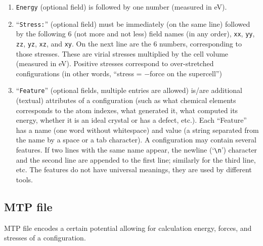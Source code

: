 \documentclass[12pt]{article}
\renewcommand{\_}{\char`_}
\begin{document}
\begin{enumerate}
	\item \texttt{Energy} (optional field) is followed by one number (measured in eV). 
	
	\item ``\texttt{Stress:}'' (optional field) must be immediately (on the same line) followed by the following 6 (not more and not less) field names (in any order), \texttt{xx}, \texttt{yy}, \texttt{zz}, \texttt{yz}, \texttt{xz}, and \texttt{xy}.
	On the next line are the 6 numbers, corresponding to those stresses.
	These are virial stresses multiplied by the cell volume (measured in eV).
	Positive stresses correspond to over-stretched configurations (in other words, ``stress = $-$force on the supercell'')
	
	\item ``\texttt{Feature}'' (optional fields, multiple entries are allowed) is/are additional (textual) attributes of a configuration (such as what chemical elements corresponds to the atom indexes, what generated it, what computed its energy, whether it is an ideal crystal or has a defect, etc.). Each ``Feature'' has a name (one word without whitespace) and value (a string separated from the name by a space or a tab character). A configuration may contain several features. 
	If two lines with the same name appear, the newline (`\texttt{\textbackslash n}') character and the second line are appended to the first line; similarly for the third line, etc.
	The features do not have universal meanings, they are used by different tools.
\end{enumerate}




\subsection{MTP file}\label{sup:mlip:mtp}

MTP file encodes a certain potential allowing for calculation energy, forces, and stresses of a configuration.
\end{document}
